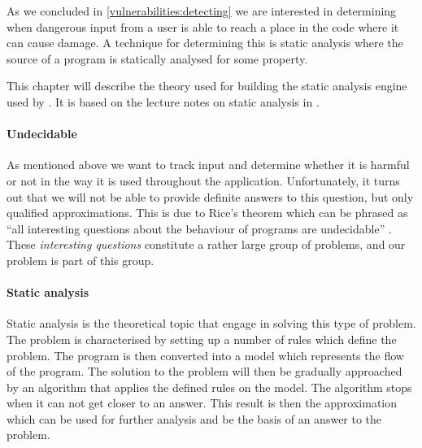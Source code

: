 As we concluded in \cref{vulnerabilities:detecting}  we are interested in determining when dangerous input from a user is able to reach a place in the code where it can cause damage.
A technique for determining this is static analysis where the source of a program is statically analysed for some property.

This chapter will describe the theory used for building the static analysis engine used by \pyt{}.
It is based on the lecture notes on static analysis in \citet{schwartzbach}.

\paragraph{Undecidable}\label{theory_intro}
As mentioned above we want to track input and determine whether it is harmful or not in the way it is used throughout the application.
Unfortunately, it turns out that we will not be able to provide definite answers to this question, but only qualified approximations.
This is due to Rice's theorem which can be phrased as ``all interesting questions about the behaviour of programs are undecidable'' \citep[p.~3]{schwartzbach}.
These \emph{interesting questions} constitute a rather large group of problems, and our problem is part of this group.

\paragraph{Static analysis}
Static analysis is the theoretical topic that engage in solving this type of problem.
The problem is characterised by setting up a number of rules which define the problem.
The program is then converted into a model which represents the flow of the program.
The solution to the problem will then be gradually approached by an algorithm that applies the defined rules on the model.
The algorithm stops when it can not get closer to an answer.
This result is then the approximation which can be used for further analysis and be the basis of an answer to the problem.

